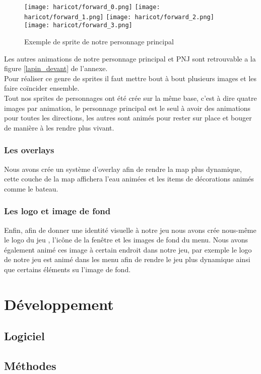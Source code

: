 \documentclass{article}
\begin{document}
\begin{figure}[h]
    \centering
    \texttt{[image: haricot/forward\_0.png]}
    \texttt{[image: haricot/forward\_1.png]}
    \texttt{[image: haricot/forward\_2.png]}
    \texttt{[image: haricot/forward\_3.png]}
    \caption{Exemple de sprite de notre personnage principal}
\end{figure}
Les autres animations de notre personnage principal et PNJ sont retrouvable a la figure \ref{lapin_devant} de l'annexe.
\\
Pour réaliser ce genre de sprites il faut mettre bout à bout plusieurs images et les faire coïncider ensemble.\\
Tout nos sprites de personnages ont été crée sur la même base, c'est à dire quatre images par animation, le personnage principal est le seul à avoir des animations pour toutes les directions, les autres sont animés pour rester sur place et bouger de manière à les rendre plus vivant.
\\
\subsubsection{Les overlays}
Nous avons crée un système d'overlay afin de rendre la map plus dynamique, cette couche de la map affichera l'eau animées et les items de décorations animés comme le bateau.

\subsubsection{Les logo et image de fond}
Enfin, afin de donner une identité visuelle à notre jeu nous avons crée nous-même le logo du jeu , l'icône de la fenêtre et les images de fond du menu. Nous avons également animé ces image à certain endroit dans notre jeu, par exemple le logo de notre jeu est animé dans les menu afin de rendre le jeu plus dynamique ainsi que certains éléments su l'image de fond.

\section{Développement}
\subsection{Logiciel}
\subsection{Méthodes}
\end{document}
